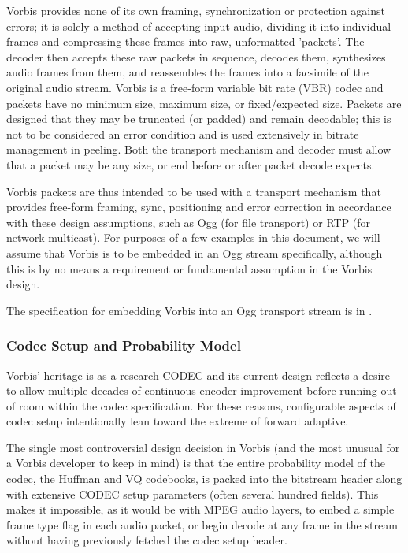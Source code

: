Vorbis provides none of its own framing, synchronization or protection
against errors; it is solely a method of accepting input audio,
dividing it into individual frames and compressing these frames into
raw, unformatted 'packets'. The decoder then accepts these raw
packets in sequence, decodes them, synthesizes audio frames from
them, and reassembles the frames into a facsimile of the original
audio stream. Vorbis is a free-form variable bit rate (VBR) codec and packets have no
minimum size, maximum size, or fixed/expected size.  Packets
are designed that they may be truncated (or padded) and remain
decodable; this is not to be considered an error condition and is used
extensively in bitrate management in peeling.  Both the transport
mechanism and decoder must allow that a packet may be any size, or
end before or after packet decode expects.

Vorbis packets are thus intended to be used with a transport mechanism
that provides free-form framing, sync, positioning and error correction
in accordance with these design assumptions, such as Ogg (for file
transport) or RTP (for network multicast).  For purposes of a few
examples in this document, we will assume that Vorbis is to be
embedded in an Ogg stream specifically, although this is by no means a
requirement or fundamental assumption in the Vorbis design.

The specification for embedding Vorbis into
an Ogg transport stream is in .



\subsubsection{Codec Setup and Probability Model}

Vorbis' heritage is as a research CODEC and its current design
reflects a desire to allow multiple decades of continuous encoder
improvement before running out of room within the codec specification.
For these reasons, configurable aspects of codec setup intentionally
lean toward the extreme of forward adaptive.

The single most controversial design decision in Vorbis (and the most
unusual for a Vorbis developer to keep in mind) is that the entire
probability model of the codec, the Huffman and VQ codebooks, is
packed into the bitstream header along with extensive CODEC setup
parameters (often several hundred fields).  This makes it impossible,
as it would be with MPEG audio layers, to embed a simple frame type
flag in each audio packet, or begin decode at any frame in the stream
without having previously fetched the codec setup header.


